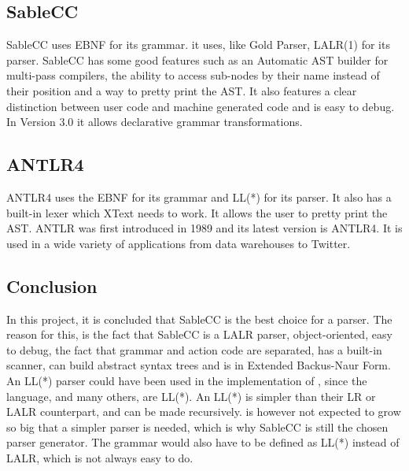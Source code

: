 \subsection{SableCC}
SableCC uses EBNF for its grammar. it uses, like Gold Parser, LALR(1) for its parser. SableCC has some good features such as an Automatic AST builder for multi-pass compilers, the ability to access sub-nodes by their name instead of their position and a way to pretty print the AST. It also features a clear distinction between user code and machine generated code and is easy to debug. In Version 3.0 it allows declarative grammar transformations.

\subsection{ANTLR4}
ANTLR4 uses the EBNF for its grammar and LL(*)  for its parser. It also has a built-in lexer which XText needs to work. It allows the user to pretty print the AST. ANTLR was first introduced in 1989 and its latest version is ANTLR4. It is used in a wide variety of applications from data warehouses to Twitter.

\subsection{Conclusion}
In this project, it is concluded that SableCC is the best choice for a parser. The reason for this, is the fact that SableCC is a LALR parser, object-oriented, easy to debug, the fact that grammar and action code are separated, has a built-in scanner, can build abstract syntax trees and is in Extended Backus-Naur Form.
An LL(*) parser could have been used in the implementation of \lang{}, since the \lang{} language, and many others, are LL(*).
An LL(*) is simpler than their LR or LALR counterpart, and can be made recursively. \lang{} is however not expected to grow so big that a simpler parser is needed, which is why SableCC is still the chosen parser generator. The grammar would also have to be defined as LL(*) instead of LALR, which is not always easy to do.